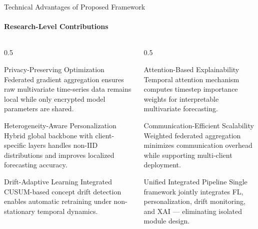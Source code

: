 \documentclass[aspectratio=169, 11pt]{beamer}
\begin{document}
\begin{frame}{Technical Advantages of Proposed Framework}
    \framesubtitle{Research-Level Contributions}

    \small
    \begin{columns}
        \begin{column}{0.5\textwidth}

            \begin{block}{Privacy-Preserving Optimization}
                Federated gradient aggregation ensures raw multivariate time-series data remains local while only encrypted model parameters are shared.
            \end{block}

            \vspace{0.2cm}
            \begin{block}{Heterogeneity-Aware Personalization}
                Hybrid global backbone with client-specific layers handles non-IID distributions and improves localized forecasting accuracy.
            \end{block}

            \vspace{0.2cm}
            \begin{block}{Drift-Adaptive Learning}
                Integrated CUSUM-based concept drift detection enables automatic retraining under non-stationary temporal dynamics.
            \end{block}

        \end{column}

        \begin{column}{0.5\textwidth}

            \begin{block}{Attention-Based Explainability}
                Temporal attention mechanism computes timestep importance weights for interpretable multivariate forecasting.
            \end{block}

            \vspace{0.2cm}
            \begin{block}{Communication-Efficient Scalability}
                Weighted federated aggregation minimizes communication overhead while supporting multi-client deployment.
            \end{block}

            \vspace{0.2cm}
            \begin{block}{Unified Integrated Pipeline}
                Single framework jointly integrates FL, personalization, drift monitoring, and XAI — eliminating isolated module design.
            \end{block}

        \end{column}
    \end{columns}
\end{frame}
\end{document}
